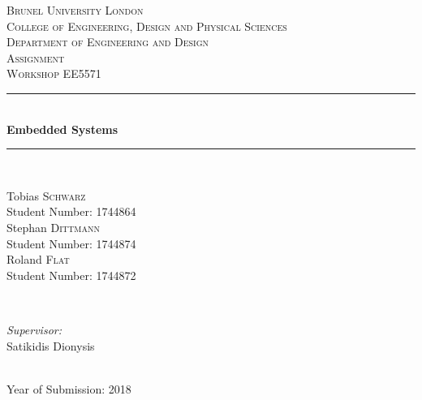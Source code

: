 \documentclass[13pt, a4paper,headinclude, 
footinclude, 
plainfootsepline]{scrreprt} %
\newcommand{\theuniversity}{Brunel University London}
\newcommand{\thecollege}{College of Engineering, Design and Physical Sciences}
\newcommand{\thedepartment}{Department of Engineering and Design}
\newcommand{\thecoursetitle}{Assignment \\ Workshop EE5571}
\newcommand{\thestudent}{Tobias \textsc{Schwarz}}
\newcommand{\thestudentid}{1744864}
\newcommand{\thestudenttwo}{Stephan \textsc{Dittmann}}
\newcommand{\thestudentidtwo}{1744874}
\newcommand{\thestudentthree}{Roland \textsc{Flat}}
\newcommand{\thestudentidthree}{1744872}
\newcommand{\thesupervisor}{Satikidis Dionysis}
\newcommand{\theyear}{2018}
\newcommand{\thetitle}{Embedded Systems}
\theoremstyle{plain}
\theoremstyle{definition}
\begin{document}
	
	
	
\onehalfspacing


\begin{titlepage}
	\center
	
	\textsc{\LARGE \theuniversity} \\[1.5cm] 
	\textsc{\large 
		\thecollege \\
		\thedepartment} \\[1.5cm]
	\textsc{\Large \thecoursetitle} \\[3.0cm]
	
	\rule{\linewidth}{0.5mm} \\[0.5cm]
	{ \huge\textbf{ \thetitle } } \\
	\rule{\linewidth}{0.5mm} \\[5cm]
	
	\begin{minipage}{0.4\textwidth}
		\begin{flushleft} \large
			\thestudent \\
			Student Number: \thestudentid \\
			\thestudenttwo \\
			Student Number: \thestudentidtwo \\
			\thestudentthree \\
			Student Number: \thestudentidthree
		\end{flushleft}
	\end{minipage}
	~
	\begin{minipage}{0.4\textwidth}
		\begin{flushright} \large
			\emph{Supervisor:} \\
			\thesupervisor
		\end{flushright}
	\end{minipage}\\[1cm]
	
	{\large Year of Submission: \theyear} \\[3cm] 
	
	\vfill %
\end{titlepage}
\newpage

\end{document}
